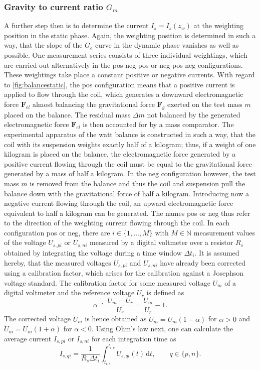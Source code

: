 \documentclass{report}
\numberwithin{tm}{section}
\newcommand\vect[1]{\ensuremath{\bm{#1}}}
\begin{document}
\subsubsection{Gravity to current ratio $G_m$}
A further step then is to determine the current $I_s = I_s(z_w)$ at the weighting position in the static phase. Again, the weighting position is determined in such a way, that the slope of the $G_e$ curve in the dynamic phase vanishes as well as possible. One measurement series consists of three individual weightings, which are carried out alternatively in the pos-neg-pos or neg-pos-neg configurations. These weightings take place a constant positive or negative currents. With regard to \cref{fig:balancestatic}, the pos configuration means that a positive current is applied to flow through the coil, which generates a downward electromagnetic force $\vect{F}_{el}$ almost balancing the gravitational force $\vect{F}_g$ exerted on the test mass $m$ placed on the balance. The residual mass $\Delta m$ not balanced by the generated electromagnetic force $\vect{F}_{el}$ is then accounted for by a mass comparator. The experimental apparatus of the watt balance is constructed in such a way, that the coil with its suspension weights exactly half of a kilogram; thus, if a weight of one kilogram is placed on the balance, the electromagnetic force generated by a positive current flowing through the coil must be equal to the gravitational force generated by a mass of half a kilogram. In the neg configuration however, the test mass $m$ is removed from the balance and thus the coil and suspension pull the balance down with the gravitational force of half a kilogram. Introducing now a negative current flowing through the coil, an upward electromagnetic force equivalent to half a kilogram can be generated. The names pos or neg thus refer to the direction of the weighting current flowing through the coil. In each configuration pos or neg, there are $i \in \{1,\dots,M\}$ with $M \in \mathbb{N}$ measurement values of the voltage $U_{s,pi}$ or $U_{s,ni}$ measured by a digital voltmeter over a resistor $R_s$ obtained by integrating the voltage during a time window $\Delta t_i$. It is assumed hereby, that the measured voltages $U_{s,pi}$ and $U_{s,ni}$ have already been corrected using a calibration factor, which arises for the calibration against a Josephson voltage standard. The calibration factor for some measured voltage $U_m$ of a digital voltmeter and the reference voltage $U_r$ is defined as \begin{equation}\alpha \doteq \frac{U_m-U_r}{U_r} = \frac{U_m}{U_r}-1.\end{equation} The corrected voltage $\tilde{U}_m$ is hence obtained as $\tilde{U}_m = U_m(1-\alpha)$ for $\alpha > 0$ and $\tilde{U}_m = U_m(1+\alpha)$ for $\alpha < 0$. Using Ohm's law next, one can calculate the average current $I_{s,pi}$ or $I_{s,ni}$ for each integration time as \begin{equation}
	I_{s,qi} = \frac{1}{R_s\Delta t_i}\int_{t_{i,s}}^{t_{i,e}}U_{s,qi}(t)\,\mathrm{d}t, \qquad q \in \{p,n\}.
\end{equation}
\end{document}
